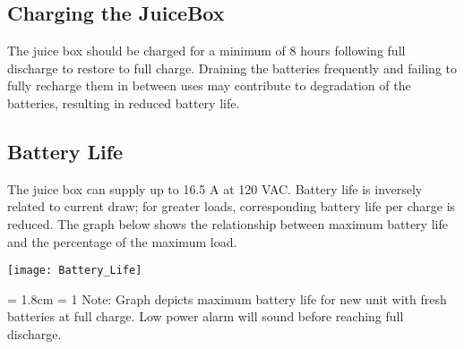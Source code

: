 \documentclass[../jb_user_manual.tex]{subfiles}
\begin{document}

\subsection{\Large{Charging the JuiceBox}}

The juice box should be charged for a minimum of 8 hours following full discharge to restore to full charge.  Draining the batteries frequently and failing to fully recharge them in between uses may contribute to degradation of the batteries, resulting in reduced battery life.

\subsection{\Large{Battery Life}}

The juice box can supply up to 16.5 A at 120 VAC.  Battery life is inversely related to current draw; for greater loads, corresponding battery life per charge is reduced.  The graph below shows the relationship between maximum battery life and the percentage of the maximum load.

\vspace{3mm}
\texttt{[image: Battery\_Life]}
\vspace{3mm}

\hangindent = 1.8cm
\hangafter = 1
Note: Graph depicts maximum battery life for new unit with fresh batteries at full charge.  Low power alarm will sound before reaching full discharge.
\end{document}
